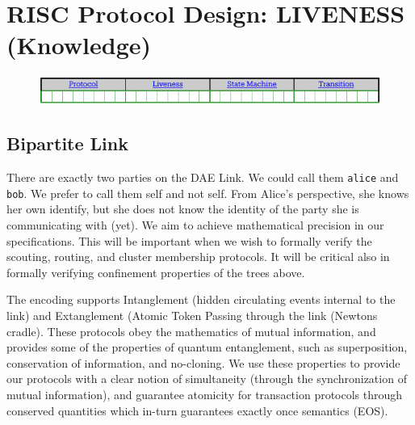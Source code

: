 \documentclass[../../../OAE-SPEC-MAIN.tex]{subfiles}
\begin{document}
 \section{RISC Protocol Design: LIVENESS (Knowledge)}

\begin{fullwidth}
 \begin{figure}
 
\includegraphics[width=1.6\linewidth]{./figures/First-Slice-Encodings.pdf}
\end{figure}
\end{fullwidth}


%


\subsection{Bipartite Link}

There are exactly two parties on the DAE Link. We could call them \texttt{alice} and \texttt{bob}. We prefer to call them self and not self. From Alice’s perspective, she knows her own identify, but she does not know the identity of the party she is communicating with (yet). We aim to achieve mathematical precision in our specifications. This will be important when we wish to formally verify the scouting, routing, and cluster membership protocols. It will be critical also in formally verifying confinement properties of the trees above.

The encoding supports Intanglement (hidden circulating events internal to the link) and Extanglement (Atomic Token Passing through the link (Newtons cradle). These protocols obey the mathematics of mutual information, and provides some of the properties of quantum entanglement, such as superposition, conservation of information, and no-cloning. We use these properties to provide our protocols with a clear notion of simultaneity (through the synchronization of mutual information), and guarantee atomicity for transaction protocols through conserved quantities which in-turn guarantees exactly once semantics (EOS).
\end{document}
